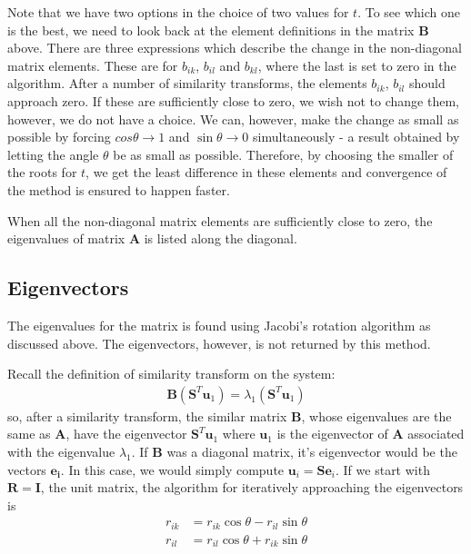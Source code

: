 \documentclass[11pt, a4paper]{article}
\newcommand{\A}{\mathbf{A}}
\renewcommand{\S}{\mathbf{S}}
\newcommand{\B}{\mathbf{B}}
\begin{document}
			Note that we have two options in the choice of two values for $t$. To see which one is the best, we need to look back at the element definitions in the matrix $\B$ above. There are three expressions which describe the change in the non-diagonal matrix elements. These are for $b_{ik}$, $b_{il}$ and $b_{kl}$, where the last is set to zero in the algorithm. After a number of similarity transforms, the elements $b_{ik}$, $b_{il}$ should approach zero. If these are sufficiently close to zero, we wish not to change them, however, we do not have a choice. We can, however, make the change as small as possible by forcing $cos\theta \rightarrow 1$ and $\sin \theta \rightarrow 0$ simultaneously - a result obtained by letting the angle $\theta$ be as small as possible.
			Therefore, by choosing the smaller of the roots for $t$, we get the least difference in these elements and convergence of the method is ensured to happen faster.
			
			When all the non-diagonal matrix elements are sufficiently close to zero, the eigenvalues of matrix $\A$ is listed along the diagonal.
			
		\subsection{Eigenvectors}
			The eigenvalues for the matrix is found using Jacobi's rotation algorithm as discussed above. The eigenvectors, however, is not returned by this method.
			
			Recall the definition of similarity transform on the system:
			\begin{align*}
				\B(\S^T\mathbf{u}_1) = \lambda_1 (\S^T\mathbf{u}_1)
			\end{align*}
			so, after a similarity transform, the similar matrix $\B$, whose eigenvalues are the same as $\A$, have the eigenvector $\S^T\mathbf{u}_1$ where $\mathbf{u}_1$ is the eigenvector of $\A$ associated with the eigenvalue $\lambda_1$. If $\B$ was a diagonal matrix, it's eigenvector would be the vectors $\mathbf{e_i}$. In this case, we would simply compute $\mathbf{u}_i = \S \mathbf{e}_i$. If we start with $\mathbf{R}=\mathbf{I}$, the unit matrix, the algorithm for iteratively approaching the eigenvectors is
			\begin{align*}
				r_{ik} &= r_{ik}\cos \theta - r_{il}\sin \theta \\
				r_{il} &= r_{il}\cos \theta + r_{ik}\sin \theta
			\end{align*}
		
\end{document}
